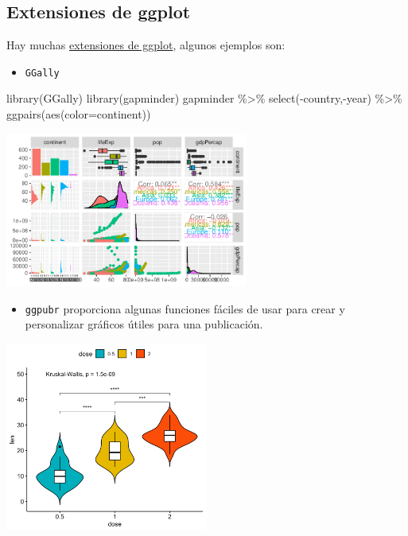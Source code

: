 \documentclass[
  letterpaper,
  DIV=11,
  numbers=noendperiod]{scrreprt}
\newenvironment{Shaded}{\begin{snugshade}}{\end{snugshade}}
\newcommand{\AttributeTok}[1]{\textcolor[rgb]{0.40,0.45,0.13}{#1}}
\newcommand{\FunctionTok}[1]{\textcolor[rgb]{0.28,0.35,0.67}{#1}}
\newcommand{\NormalTok}[1]{\textcolor[rgb]{0.00,0.23,0.31}{#1}}
\newcommand{\SpecialCharTok}[1]{\textcolor[rgb]{0.37,0.37,0.37}{#1}}
\providecommand{\tightlist}{%
  \setlength{\itemsep}{0pt}\setlength{\parskip}{0pt}}\usepackage{longtable,booktabs,array}
\begin{document}
\subsection{Extensiones de ggplot}\label{extensiones-de-ggplot}

Hay muchas
\href{https://exts.ggplot2.tidyverse.org/gallery/}{extensiones de
ggplot}, algunos ejemplos son:

\begin{itemize}
\tightlist
\item
  \texttt{GGally}
\end{itemize}

\begin{Shaded}
\begin{Highlighting}[]
\FunctionTok{library}\NormalTok{(GGally)}
\FunctionTok{library}\NormalTok{(gapminder)}
\NormalTok{gapminder }\SpecialCharTok{\%\textgreater{}\%} \FunctionTok{select}\NormalTok{(}\SpecialCharTok{{-}}\NormalTok{country,}\SpecialCharTok{{-}}\NormalTok{year) }\SpecialCharTok{\%\textgreater{}\%} 
  \FunctionTok{ggpairs}\NormalTok{(}\FunctionTok{aes}\NormalTok{(}\AttributeTok{color=}\NormalTok{continent))}
\end{Highlighting}
\end{Shaded}

\begin{center}
\includegraphics[width=0.6\textwidth,height=\textheight]{t1_intro_files/figure-pdf/unnamed-chunk-107-1.pdf}
\end{center}

\begin{itemize}
\tightlist
\item
  \texttt{ggpubr} proporciona algunas funciones fáciles de usar para
  crear y personalizar gráficos útiles para una publicación.
\end{itemize}

\begin{center}
\includegraphics[width=0.5\textwidth,height=0.5\textheight]{Figuras/grafico_violin.png}
\end{center}
\end{document}
